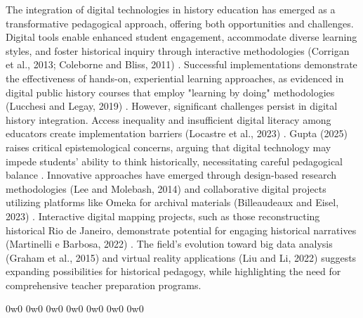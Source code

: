 The integration of digital technologies in history education has emerged as a transformative pedagogical approach, offering both opportunities and challenges. Digital tools enable enhanced student engagement, accommodate diverse learning styles, and foster historical inquiry through interactive methodologies (Corrigan et al., 2013; Coleborne and Bliss, 2011) \cite{Corrigan201349}. Successful implementations demonstrate the effectiveness of hands-on, experiential learning approaches, as evidenced in digital public history courses that employ "learning by doing" methodologies (Lucchesi and Legay, 2019) \cite{Lucchesi2019}.
However, significant challenges persist in digital history integration. Access inequality and insufficient digital literacy among educators create implementation barriers (Locastre et al., 2023) \cite{Locastre2023417}. Gupta (2025) raises critical epistemological concerns, arguing that digital technology may impede students' ability to think historically, necessitating careful pedagogical balance \cite{Gupta2025102}.
Innovative approaches have emerged through design-based research methodologies (Lee and Molebash, 2014) \cite{LeeMolebash} and collaborative digital projects utilizing platforms like Omeka for archival materials (Billeaudeaux and Eisel, 2023) \cite{Billeaudeaux2023154}. Interactive digital mapping projects, such as those reconstructing historical Rio de Janeiro, demonstrate potential for engaging historical narratives (Martinelli e Barbosa, 2022) \cite{Martinelli}. The field's evolution toward big data analysis (Graham et al., 2015) and virtual reality applications (Liu and Li, 2022) \cite{liu} suggests expanding possibilities for historical pedagogy, while highlighting the need for comprehensive teacher preparation programs.

0w0 0w0 0w0 0w0 0w0 0w0 0w0 

